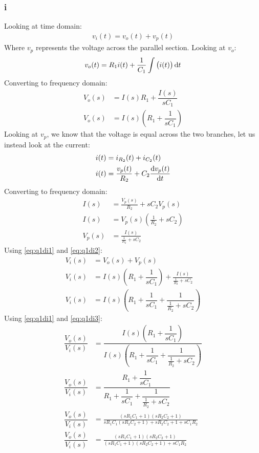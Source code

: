 \documentclass[11pt]{article}
\numberwithin{equation}{section}
\begin{document}
\subsubsection{i}
Looking at time domain:
\begin{align}
    v_i(t) = v_o(t) + v_p(t)
\end{align}
Where $v_p$ represents the voltage across the parallel section. Looking at $v_o$:
\begin{align}
    v_o(t) = R_1 i(t) + \dfrac{1}{C_1}\int \left(i(t)\right)\dif t
\end{align}
Converting to frequency domain:
\begin{align}
    V_o(s) &= I(s) R_1 + \dfrac{I(s)}{sC_1}\\
    V_o(s) &= I(s) \left(R_1 + \dfrac{1}{sC_1}\right) \label{eq:q1di1}
\end{align}
Looking at $v_p$, we know that the voltage is equal across the two branches, let us instead look at the current:
\begin{align}
    i(t) &= i_{R_2}(t) + i_{C_2}(t)\\
    i(t) &= \frac{v_p(t)}{R_2} + C_2 \dfrac{\dif v_p(t)}{\dif t}
\end{align}
Converting to frequency domain:
\begin{align}
    I(s) &= \frac{V_p(s)}{R_2} + sC_2V_p(s)\\
    I(s) &= V_p(s) \left(\frac{1}{R_2} + sC_2\right)\\
    V_p(s) &= \frac{I(s)}{\frac{1}{R_2}+sC_2} \label{eq:q1di2}
\end{align}
Using \ref{eq:q1di1} and \ref{eq:q1di2}:
\begin{align}
    V_i(s) &= V_o(s) + V_p(s)\\
    V_i(s) &= I(s) \left(R_1 + \dfrac{1}{sC_1}\right) + \frac{I(s)}{\frac{1}{R_2}+sC_2}\\
    V_i(s) &= I(s) \left(R_1 + \dfrac{1}{sC_1} + \dfrac{1}{\frac{1}{R_2} + sC_2}\right) \label{eq:q1di3}
\end{align}
Using \ref{eq:q1di1} and \ref{eq:q1di3}:
\begin{align}
    \dfrac{V_o(s)}{V_i(s)} &= \dfrac{I(s) \left(R_1 + \dfrac{1}{sC_1}\right)}{I(s) \left(R_1 + \dfrac{1}{sC_1} + \dfrac{1}{\frac{1}{R_2} + sC_2}\right)}\\
    \dfrac{V_o(s)}{V_i(s)} &= \dfrac{R_1 + \dfrac{1}{sC_1}}{R_1 + \dfrac{1}{sC_1} + \dfrac{1}{\frac{1}{R_2} + sC_2}}\\
    \dfrac{V_o(s)}{V_i(s)} &= \frac{\left(sR_1 C_1 + 1 \right)\left(sR_2C_2 + 1\right)}{sR_1 C_1 \left(sR_2C_2 + 1\right) + sR_2 C_2 + 1 + sC_1 R_2}\\
    \dfrac{V_o(s)}{V_i(s)} &= \frac{\left(sR_1 C_1 + 1 \right)\left(sR_2C_2 + 1\right)}{\left(sR_1 C_1 + 1 \right)\left(sR_2C_2 + 1\right) + sC_1 R_2 }
\end{align}
\end{document}
